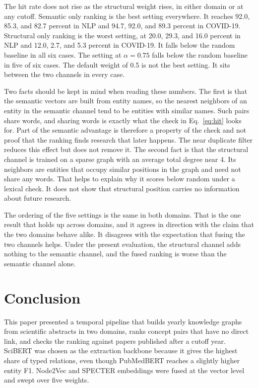 \documentclass{ieeeaccess}
\begin{document}
The hit rate does not rise as the structural weight rises, in either domain or at any cutoff. Semantic only ranking is the best setting everywhere. It reaches 92.0, 85.3, and 82.7 percent in NLP and 94.7, 92.0, and 89.3 percent in COVID-19. Structural only ranking is the worst setting, at 20.0, 29.3, and 16.0 percent in NLP and 12.0, 2.7, and 5.3 percent in COVID-19. It falls below the random baseline in all six cases. The setting at $\alpha = 0.75$ falls below the random baseline in five of six cases. The default weight of 0.5 is not the best setting. It sits between the two channels in every case.

Two facts should be kept in mind when reading these numbers. The first is that the semantic vectors are built from entity names, so the nearest neighbors of an entity in the semantic channel tend to be entities with similar names. Such pairs share words, and sharing words is exactly what the check in Eq.~\eqref{eq:hit} looks for. Part of the semantic advantage is therefore a property of the check and not proof that the ranking finds research that later happens. The near duplicate filter reduces this effect but does not remove it. The second fact is that the structural channel is trained on a sparse graph with an average total degree near 4. Its neighbors are entities that occupy similar positions in the graph and need not share any words. That helps to explain why it scores below random under a lexical check. It does not show that structural position carries no information about future research.

The ordering of the five settings is the same in both domains. That is the one result that holds up across domains, and it agrees in direction with the claim that the two domains behave alike. It disagrees with the expectation that fusing the two channels helps. Under the present evaluation, the structural channel adds nothing to the semantic channel, and the fused ranking is worse than the semantic channel alone.

\section{Conclusion}
\label{sec:conclusion}

This paper presented a temporal pipeline that builds yearly knowledge graphs from scientific abstracts in two domains, ranks concept pairs that have no direct link, and checks the ranking against papers published after a cutoff year. SciBERT was chosen as the extraction backbone because it gives the highest share of typed relations, even though PubMedBERT reaches a slightly higher entity F1. Node2Vec and SPECTER embeddings were fused at the vector level and swept over five weights.
\end{document}
